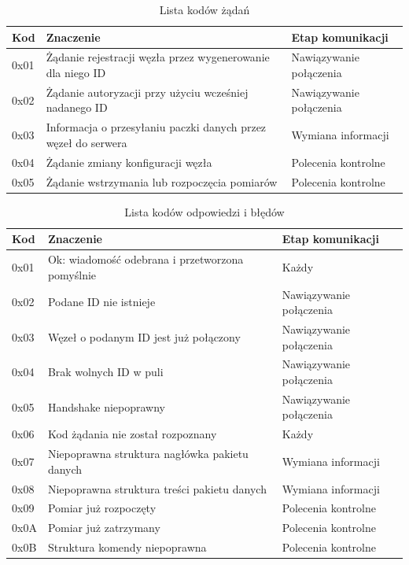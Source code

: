 \documentclass[12pt,oneside,a4paper]{book}
\theoremstyle{break}
\begin{document}
\begin{table}[ht]
    \centering
    \begin{tabularx}{\textwidth}{|l | X | X|}
    Kod & Znaczenie & Etap komunikacji \\
    \hline
    0x01 & Żądanie rejestracji węzła przez wygenerowanie dla niego ID & Nawiązywanie połączenia \\
    0x02 & Żądanie autoryzacji przy użyciu wcześniej nadanego ID & Nawiązywanie połączenia \\
    0x03 & Informacja o przesyłaniu paczki danych przez węzeł do serwera & Wymiana informacji \\
    0x04 & Żądanie zmiany konfiguracji węzła & Polecenia kontrolne \\
    0x05 & Żądanie wstrzymania lub rozpoczęcia pomiarów & Polecenia kontrolne \\
    \end{tabularx}
    \caption{Lista kodów żądań}
    \label{tab:request-codes}
\end{table}

\begin{table}[ht]
    \centering
    \begin{tabularx}{\textwidth}{|l | X | X|}
    Kod & Znaczenie & Etap komunikacji \\
    \hline
    0x01 & Ok: wiadomość odebrana i przetworzona pomyślnie & Każdy \\
    0x02 & Podane ID nie istnieje & Nawiązywanie połączenia \\
    0x03 & Węzeł o podanym ID jest już połączony & Nawiązywanie połączenia \\
    0x04 & Brak wolnych ID w puli & Nawiązywanie połączenia \\
    0x05 & Handshake niepoprawny & Nawiązywanie połączenia \\
    0x06 & Kod żądania nie został rozpoznany & Każdy \\
    0x07 & Niepoprawna struktura nagłówka pakietu danych & Wymiana informacji \\
    0x08 & Niepoprawna struktura treści pakietu danych & Wymiana informacji \\
    0x09 & Pomiar już rozpoczęty & Polecenia kontrolne \\
    0x0A & Pomiar już zatrzymany & Polecenia kontrolne \\
    0x0B & Struktura komendy niepoprawna & Polecenia kontrolne \\
    \end{tabularx}
    \caption{Lista kodów odpowiedzi i błędów}
    \label{tab:response-codes}
\end{table}
\end{document}
